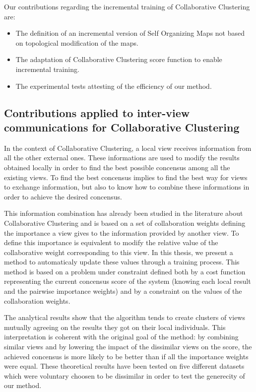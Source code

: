 Our contributions regarding the incremental training of Collaborative Clustering are:
\begin{itemize}
    \item The definition of an incremental version of Self Organizing Maps not based on topological modification of the maps.
    \item The adaptation of Collaborative Clustering score function to enable incremental training.
    \item The experimental tests attesting of the efficiency of our method.
\end{itemize}

\subsection{Contributions applied to inter-view communications for Collaborative Clustering}

In the context of Collaborative Clustering, a local view receives information from all the other external ones. These informations are used to modify the results obtained locally in order to find the best possible concensus among all the existing views. To find the best concensus implies to find the best way for views to exchange information, but also to know how to combine these informations in order to achieve the desired concensus.

This information combination has already been studied in the literature about Collaborative Clustering and is based on a set of collaboration weights defining the importance a view gives to the information provided by another view. To define this importance is equivalent to modify the relative value of the collaborative weight corresponding to this view. In this thesis, we present a method to automaticaly update these values through a training process. This method is based on a problem under constraint defined both by a cost function representing the current concensus score of the system (knowing each local result and the pairwise importance weights) and by a constraint on the values of the collaboration weights. 

The analytical results show that the algorithm tends to create clusters of views mutually agreeing on the results they got on their local individuals. This interpretation is coherent with the original goal of the method: by combining similar views and by lowering the impact of the dissimilar views on the score, the achieved concensus is more likely to be better than if all the importance weights were equal. These theoretical results have been tested on five different datasets which were voluntary choosen to be dissimilar in order to test the generecity of our method.

